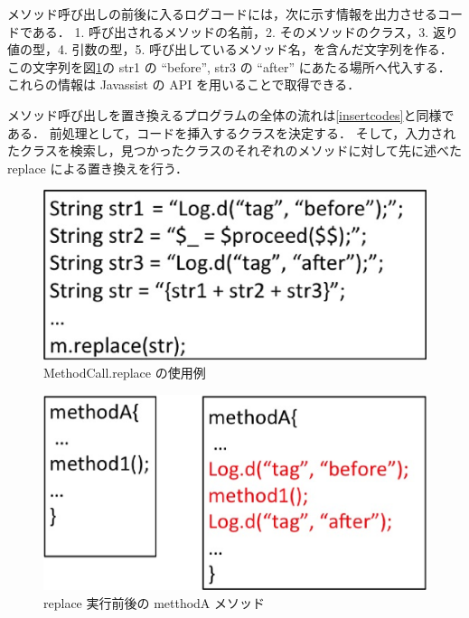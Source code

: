 メソッド呼び出しの前後に入るログコードには，次に示す情報を出力させるコードである．
1. 呼び出されるメソッドの名前，2. そのメソッドのクラス，3. 返り値の型，4. 引数の型，5. 呼び出しているメソッド名，を含んだ文字列を作る．
この文字列を図\ref{replace}の str1 の ``before'', str3 の ``after'' にあたる場所へ代入する．
これらの情報は Javassist の API を用いることで取得できる．

メソッド呼び出しを置き換えるプログラムの全体の流れは\ref{insertcodes}と同様である．
前処理として，コードを挿入するクラスを決定する．
そして，入力されたクラスを検索し，見つかったクラスのそれぞれのメソッドに対して先に述べた replace による置き換えを行う．

\begin{figure}[t]
\begin{center}
\graphicspath{{./epsfiles/}}
\includegraphics[scale=0.3]{replace.eps}
\end{center}
\caption{MethodCall.replace の使用例}
\label{replace}
\end{figure}

\begin{figure}[t]
\begin{center}
\graphicspath{{./epsfiles/}}
\includegraphics[scale=0.3]{methoda.eps}
\end{center}
\caption{replace 実行前後の metthodA メソッド}
\label{methoda}
\end{figure}

